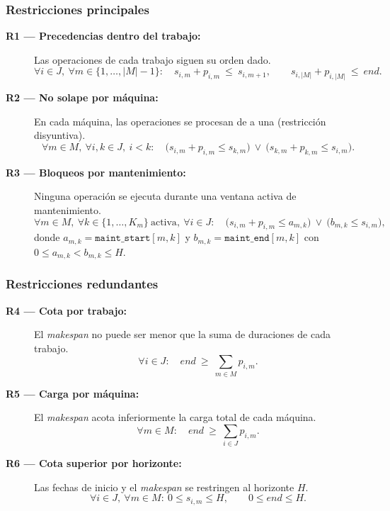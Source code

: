 \subsubsection*{Restricciones principales}
\begin{description}
  \item[\textbf{R1 — Precedencias dentro del trabajo:}] Las operaciones de cada trabajo siguen su orden dado.  
  \[
  \forall i\in J,\ \forall m\in\{1,\dots,|M|-1\}:\quad
  s_{i,m}+p_{i,m}\ \le\ s_{i,m+1},
  \qquad
  s_{i,|M|}+p_{i,|M|}\ \le\ \textit{end}.
  \]

  \item[\textbf{R2 — No solape por máquina:}] En cada máquina, las operaciones se procesan de a una (restricción disyuntiva).  
  \[
  \forall m\in M,\ \forall i,k\in J,\ i<k:\quad
  \big(s_{i,m}+p_{i,m}\le s_{k,m}\big)\ \lor\ \big(s_{k,m}+p_{k,m}\le s_{i,m}\big).
  \]

  \item[\textbf{R3 — Bloqueos por mantenimiento:}] Ninguna operación se ejecuta durante una ventana activa de mantenimiento.  
  \[
  \forall m\in M,\ \forall k\in\{1,\dots,K_m\}\ \text{activa},\ \forall i\in J:\quad
  \big(s_{i,m}+p_{i,m}\le a_{m,k}\big)\ \lor\ \big(b_{m,k}\le s_{i,m}\big),
  \]
  donde \(a_{m,k}=\texttt{maint\_start}[m,k]\) y \(b_{m,k}=\texttt{maint\_end}[m,k]\) con \(0\le a_{m,k}<b_{m,k}\le H\).
\end{description}

\subsubsection*{Restricciones redundantes}
\begin{description}
  \item[\textbf{R4 — Cota por trabajo:}] El \emph{makespan} no puede ser menor que la suma de duraciones de cada trabajo.  
  \[
  \forall i\in J:\quad \textit{end}\ \ge\ \sum_{m\in M} p_{i,m}.
  \]

  \item[\textbf{R5 — Carga por máquina:}] El \emph{makespan} acota inferiormente la carga total de cada máquina.  
  \[
  \forall m\in M:\quad \textit{end}\ \ge\ \sum_{i\in J} p_{i,m}.
  \]

  \item[\textbf{R6 — Cota superior por horizonte:}] Las fechas de inicio y el \emph{makespan} se restringen al horizonte \(H\).  
  \[
  \forall i\in J,\ \forall m\in M:\ 0\le s_{i,m}\le H, 
  \qquad 0\le \textit{end}\le H.
  \]
\end{description}

